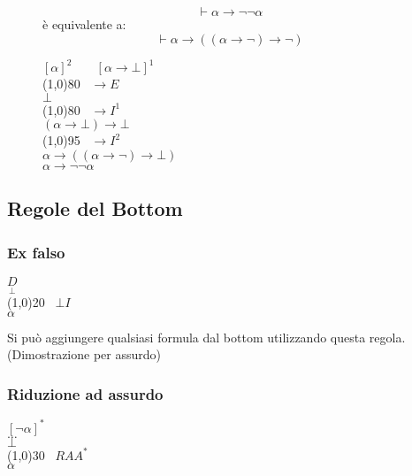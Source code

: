 \documentclass{article}
\theoremstyle{break}
\theoremstyle{break}
\theoremstyle{break}
\theoremstyle{break}
\begin{document}
\begin{figure}[H]
    \begin{example}
        \[
            \vdash \alpha \to \neg \neg \alpha 
        \] 
        è equivalente a:
        \[
            \vdash \alpha \to ((\alpha \to \neg) \to \neg)
        \] 
        \begin{center}
            \( [\alpha]^2 \;\;\;\;\;\;\; [\alpha \to  \bot]^1 \) \\
            \hspace{1cm}\line(1,0){80}\(\;\;\; \to E\)\\
            \( \bot\) \\
            \hspace{1cm}\line(1,0){80}\(\;\;\; \to I^1 \)\\
            \( (\alpha \to \bot) \to \bot\) \\
            \hspace{1cm}\line(1,0){95}\(\;\;\; \to I^2 \)\\
            \( \alpha \to ((\alpha \to \neg) \to \bot) \) \\
            \( \alpha \to \neg \neg \alpha \) 
        \end{center}
    \end{example}
\end{figure}

\subsection{Regole del Bottom}
\subsubsection{Ex falso}
\begin{center}
    \(
        \underset{\bot}{D}
    \)\\ 
        \hspace{0.8cm}\line(1,0){20}\(\;\;\; \bot I \)\\  
    \(
        \alpha
    \)
\end{center}
Si può aggiungere qualsiasi formula dal bottom utilizzando questa regola. (Dimostrazione per assurdo)
\subsubsection{Riduzione ad assurdo}
\begin{center}
    \(
    [\neg \alpha]^* 
    \)\\ 
    \( \ldots \) \\
    \( \bot \) \\
        \hspace{1.2cm}\line(1,0){30}\(\;\;\; RAA^* \)\\  
    \(
        \alpha
    \)
\end{center}
\end{document}
